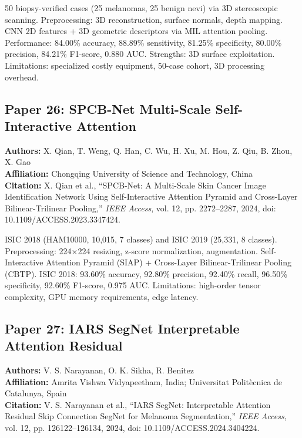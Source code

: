 \documentclass[conference]{IEEEtran}
\begin{document}
50 biopsy-verified cases (25 melanomas, 25 benign nevi) via 3D stereoscopic scanning. Preprocessing: 3D reconstruction, surface normals, depth mapping. CNN 2D features + 3D geometric descriptors via MIL attention pooling. Performance: 84.00\% accuracy, 88.89\% sensitivity, 81.25\% specificity, 80.00\% precision, 84.21\% F1-score, 0.880 AUC. Strengths: 3D surface exploitation. Limitations: specialized costly equipment, 50-case cohort, 3D processing overhead.

\subsection{Paper 26: SPCB-Net Multi-Scale Self-Interactive Attention}

\noindent\textbf{Authors:} X. Qian, T. Weng, Q. Han, C. Wu, H. Xu, M. Hou, Z. Qiu, B. Zhou, X. Gao\\
\textbf{Affiliation:} Chongqing University of Science and Technology, China\\
\textbf{Citation:} X. Qian et al., ``SPCB-Net: A Multi-Scale Skin Cancer Image Identification Network Using Self-Interactive Attention Pyramid and Cross-Layer Bilinear-Trilinear Pooling,'' \textit{IEEE Access}, vol. 12, pp. 2272--2287, 2024, doi: 10.1109/ACCESS.2023.3347424.

ISIC 2018 (HAM10000, 10,015, 7 classes) and ISIC 2019 (25,331, 8 classes). Preprocessing: 224×224 resizing, z-score normalization, augmentation. Self-Interactive Attention Pyramid (SIAP) + Cross-Layer Bilinear-Trilinear Pooling (CBTP). ISIC 2018: 93.60\% accuracy, 92.80\% precision, 92.40\% recall, 96.50\% specificity, 92.60\% F1-score, 0.975 AUC. Limitations: high-order tensor complexity, GPU memory requirements, edge latency.

\subsection{Paper 27: IARS SegNet Interpretable Attention Residual}

\noindent\textbf{Authors:} V. S. Narayanan, O. K. Sikha, R. Benitez\\
\textbf{Affiliation:} Amrita Vishwa Vidyapeetham, India; Universitat Politècnica de Catalunya, Spain\\
\textbf{Citation:} V. S. Narayanan et al., ``IARS SegNet: Interpretable Attention Residual Skip Connection SegNet for Melanoma Segmentation,'' \textit{IEEE Access}, vol. 12, pp. 126122--126134, 2024, doi: 10.1109/ACCESS.2024.3404224.
\end{document}
